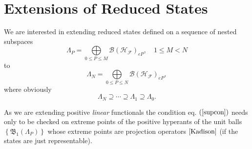 \documentclass[aps,preprint]{revtex4}%
\begin{document}
\section{Extensions of Reduced States}

We are interested in extending reduced states defined on a sequence of nested
subspaces
\begin{equation}
\Lambda_{P}=%
{\displaystyle\bigoplus\limits_{0\leq P\leq M}}
\mathcal{B}\left(  \mathcal{H}_{\mathcal{F}}\right)  _{eP},\quad1\leq M<N
\end{equation}
to%
\begin{equation}
\Lambda_{N}=%
{\displaystyle\bigoplus\limits_{0\leq P\leq N}}
\mathcal{B}\left(  \mathcal{H}_{\mathcal{F}}\right)  _{eP},
\end{equation}
where obviously
\begin{equation}
\Lambda_{N}\supseteq\cdots\supseteq\Lambda_{1}\supseteq\Lambda_{0}.
\end{equation}


As we are extending positive \emph{linear} functionals the condition eq.
$\left(  \ref{supcon}\right)  $ needs only to be checked on extreme points of
the positive hyperants of the unit balls $\left\{  \mathfrak{B}_{1}\left(
\Lambda_{P}\right)  \right\}  $ whose extreme points are projection operators
$\cite{Kadison}$ (if the states are just representable).
\end{document}
